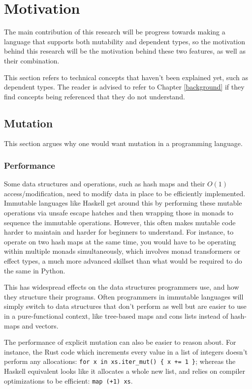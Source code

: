 \documentclass[12pt,twoside]{report}
\begin{document}
\section{Motivation}
The main contribution of this research will be progress towards making a language that supports both mutability and dependent types, so the motivation behind this research will be the motivation behind these two features, as well as their combination.

This section refers to technical concepts that haven't been explained yet, such as dependent types. The reader is advised to refer to Chapter \ref*{background} if they find concepts being referenced that they do not understand.

\subsection{Mutation}
This section argues why one would want mutation in a programming language.

\subsubsection{Performance}
Some data structures and operations, such as hash maps and their $O(1)$ access/modification, need to modify data in place to be efficiently implemented. Immutable languages like Haskell get around this by performing these mutable operations via unsafe escape hatches and then wrapping those in monads to sequence the immutable operations. However, this often makes mutable code harder to maintain and harder for beginners to understand. For instance, to operate on two hash maps at the same time, you would have to be operating within multiple monads simultaneously, which involves monad transformers or effect types, a much more advanced skillset than what would be required to do the same in Python.

This has widespread effects on the data structures programmers use, and how they structure their programs. Often programmers in immutable languages will simply switch to data structures that don't perform as well but are easier to use in a pure-functional context, like tree-based maps and cons lists instead of hash-maps and vectors.

The performance of explicit mutation can also be easier to reason about. For instance, the Rust code which increments every value in a list of integers doesn't perform any allocations: \verb|for x in xs.iter_mut() { x += 1 }|; whereas the Haskell equivalent looks like it allocates a whole new list, and relies on compiler optimizations to be efficient: \verb|map (+1) xs|.
\end{document}
